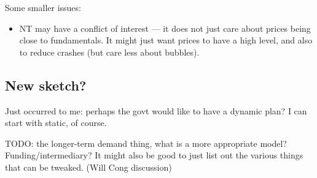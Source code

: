\documentclass[12pt]{article}
\begin{document}
Some smaller issues:
\begin{itemize}
    \item NT may have a conflict of interest --- it does not just care about prices being close to fundamentals. It might just want prices to have a high level, and also to reduce crashes (but care less about bubbles). 
\end{itemize}

\subsection{New sketch?}

Just occurred to me: perhaps the govt would like to have a dynamic plan? I can start with static, of course. 

TODO: the longer-term demand thing, what is a more appropriate model? Funding/intermediary? It might also be good to just list out the various things that can be tweaked. (Will Cong discussion)

\clearpage



\processdelayedfloats

\newpage
\appendix

    
\setcounter{figure}{0}
\setcounter{table}{0}
\renewcommand{\thetable}{\Alph{section}\arabic{table}}
\renewcommand{\thefigure}{\Alph{section}\arabic{figure}}



\processdelayedfloats
\end{document}
